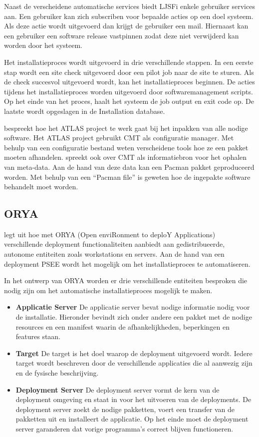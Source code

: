 Naast de verscheidene automatische services biedt LJSFi enkele gebruiker services aan.
Een gebruiker kan zich subscriben voor bepaalde acties op een doel systeem.
Als deze actie wordt uitgevoerd dan krijgt de gebruiker een mail.
Hiernaast kan een gebruiker een software release vastpinnen zodat deze niet verwijderd kan worden door het systeem.

Het installatieproces wordt uitgevoerd in drie verschillende stappen.
In een eerste stap wordt een site check uitgevoerd door een pilot job naar de site te sturen.
Als de check succesvol uitgevoerd wordt, kan het installatieproces beginnen.
De acties tijdens het installatieproces worden uitgevoerd door softwaremanagement scripts.
Op het einde van het proces, haalt het systeem de job output en exit code op.
De laatste wordt opgeslagen in de Installation database.

\citet{Obreshkov2008244} bespreekt hoe het ATLAS project te werk gaat bij het inpakken van alle nodige software.
Het ATLAS project gebruikt CMT als configuratie manager.
Met behulp van een configuratie bestand weten verscheidene tools hoe ze een pakket moeten afhandelen.
\citet{packAtlas} spreekt ook over CMT als informatiebron voor het ophalen van meta-data.
Aan de hand van deze data kan een Pacman pakket geproduceerd worden.
Met behulp van een ``Pacman file'' is geweten hoe de ingepakte software behandelt moet worden.

\subsection{ORYA}\label{sec:ORYA}
\citet{lestideau2003providing} legt uit hoe met ORYA (Open enviRonment to deploY Applications) verschillende deployment functionaliteiten aanbiedt aan gedistribueerde, autonome entiteiten zoals workstations en servers.
Aan de hand van een deployment PSEE \citep{belkhatir2007adele} wordt het mogelijk om het installatieproces te automatiseren.

In het ontwerp van ORYA worden er drie verschillende entiteiten besproken die nodig zijn om het automatische installatieproces mogelijk te maken.
\begin{itemize}
\item \textbf{Applicatie Server} De applicatie server bevat nodige informatie nodig voor de installatie.
Hieronder bevindt zich onder andere een pakket met de nodige resources en een manifest waarin de afhankelijkheden, beperkingen en features staan.
\item \textbf{Target} De target is het doel waarop de deployment uitgevoerd wordt.
Iedere target wordt beschreven door de verschillende applicaties die al aanwezig zijn en de fysische beschrijving.
\item \textbf{Deployment Server} De deployment server vormt de kern van de deployment omgeving en staat in voor het uitvoeren van de deployments. 
De deployment server zoekt de nodige pakketten, voert een transfer van de pakketten uit en installeert de applicatie.
Op het einde moet de deployment server garanderen dat vorige programma's correct blijven functioneren.
\end{itemize}

